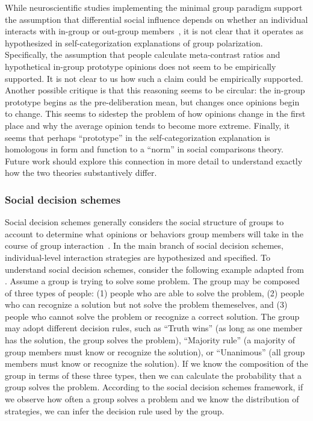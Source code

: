 While neuroscientific studies implementing the minimal group paradigm support
the assumption that differential social influence depends 
on whether an individual interacts
with in-group or out-group members~\cite{Cikara2014}, it is not clear that it operates
as hypothesized in self-categorization explanations of group polarization. 
Specifically, the assumption
that people calculate meta-contrast ratios and hypothetical in-group
prototype opinions does not seem to be empirically supported. 
It is not clear to us how such a claim could be empirically supported. 
Another possible critique is that this reasoning seems to be circular: the 
in-group prototype begins as the pre-deliberation
mean, but changes once opinions begin to change. This seems to sidestep the
problem of how opinions change in the first place and why the average opinion
tends to become more extreme. Finally, it seems that perhaps ``prototype'' in
the self-categorization explanation is homologous in form and function to
a ``norm'' in social comparisons theory. Future work should explore this connection
in more detail to understand exactly how the two theories substantively differ.


\subsubsection{Social decision schemes}

Social decision schemes generally considers the social structure of groups to
account to determine what opinions or behaviors group members will 
take in the course of group interaction~\cite{Davis1973}. In the main branch
of social decision schemes, individual-level interaction strategies are 
hypothesized and specified. To understand social decision schemes, 
consider the following example adapted from 
. Assume a group is trying to solve some problem.
The group may be composed of three types of people: 
(1) people who are able to solve the problem, (2) people
who can recognize a solution but not solve the problem themeselves, and
(3) people who cannot solve the problem or recognize a correct solution.
The group may adopt different decision rules, such as ``Truth wins'' 
(as long as one member has the solution, the group solves the problem),
``Majority rule'' (a majority of group members must know or recognize the
solution), or ``Unanimous'' (all group members must know or recognize the solution).
If we know the composition of the group in terms of these three types, then
we can calculate the probability that a group solves the problem. 
According to the social decision schemes
framework, if we observe how often a group solves a
problem and we know the distribution of strategies, we can infer the
decision rule used by the group.

